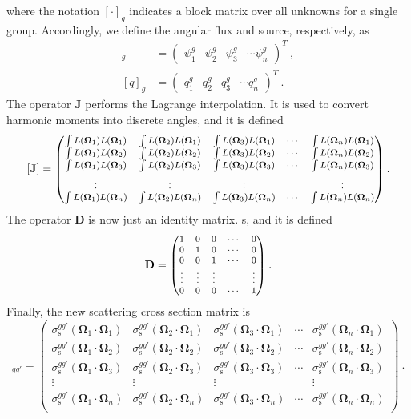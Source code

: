 \documentclass[12pt,twoside]{article}
\newcommand{\ve}[1]{\ensuremath{\mathbf{#1}}}
\newcommand{\vOmega}{\ensuremath{\ve{\Omega}}}
\newcommand{\Jij}[2]{\ensuremath{\int L(\vOmega_#1)L(\vOmega_#2)}}
\newcommand{\Sij}[2]{\ensuremath{\sigma^{gg'}_{\text{s}}(\vOmega_#1 \cdot \vOmega_#2)}}
\begin{document}
where the notation $[\cdot]_g$ indicates a block matrix over all
unknowns for a single group.  Accordingly, we define the angular flux and source, respectively, as
\begin{align}
  [\psi]_g &= \begin{pmatrix}
    \psi^g_1 & \psi^g_2 & \psi^g_3 & \cdots \psi^g_n
  \end{pmatrix}^T\:, \\
    [q]_g &= \begin{pmatrix}
    q^g_1 & q^g_2 & q^g_3 & \cdots q^g_n
  \end{pmatrix}^T\:.
\end{align}
%
The operator $\ve{J}$ performs the Lagrange interpolation. It is used
to convert harmonic moments into discrete angles, and it is defined
\begin{equation}
  {\footnotesize
  [\ve{J}] = \begin{pmatrix}
    \Jij{1}{1} & \Jij{2}{1} & \Jij{3}{1} & \cdots & \Jij{n}{1} \\
    \Jij{1}{2} & \Jij{2}{2} & \Jij{3}{2} & \cdots & \Jij{n}{2} \\
    \Jij{1}{3} & \Jij{2}{3} & \Jij{3}{3} & \cdots & \Jij{n}{3} \\
    \vdots     & \vdots     & \vdots     &        & \vdots     \\    
    \Jij{1}{n} & \Jij{2}{n} & \Jij{3}{n} & \cdots & \Jij{n}{n} \\
  \end{pmatrix}}\:.
\end{equation}
%
The operator $\ve{D}$ is now just an identity matrix. s, and it is defined
\begin{equation}
  {\footnotesize
  \ve{D} = \begin{pmatrix}
    1 & 0 & 0 & \cdots & 0 \\
    0 & 1 & 0 & \cdots & 0 \\
    0 & 0 & 1 & \cdots & 0 \\
    \vdots & \vdots & \vdots & & \vdots \\
    0 & 0 & 0 & \cdots & 1    
  \end{pmatrix}}\:.
\end{equation}
%
Finally, the new scattering cross section matrix is
\begin{equation}
  [\ve{\tilde{S}}]_{gg'} = \begin{pmatrix}
    \Sij{1}{1} & \Sij{2}{1} & \Sij{3}{1} & \cdots & \Sij{n}{1} \\
    \Sij{1}{2} & \Sij{2}{2} & \Sij{3}{2} & \cdots & \Sij{n}{2} \\
    \Sij{1}{3} & \Sij{2}{3} & \Sij{3}{3} & \cdots & \Sij{n}{3} \\
    \vdots     & \vdots     & \vdots     &        & \vdots     \\    
    \Sij{1}{n} & \Sij{2}{n} & \Sij{3}{n} & \cdots & \Sij{n}{n} \\
  \end{pmatrix}\:.
\end{equation}
\end{document}
